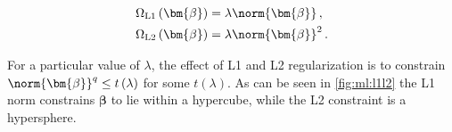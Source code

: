 \begin{subequations} \label{eq:L1_L2}
\begin{align}
\Omega_{\text{L1}}\left(\bm{\beta}\right) &= \lambda \norm{\bm{\beta}}\,,     \label{eq:L1} \\
\Omega_{\text{L2}}\left(\bm{\beta}\right) &= \lambda \norm{\bm{\beta}}^{2}\,. \label{eq:L2}
\end{align}
\end{subequations}

For a particular value of $\lambda$, the effect of L1 and L2 regularization
is to constrain $\norm{\bm{\beta}}^{q} \leq t\left(\lambda\right)$ for some $t\left(\lambda\right)$.
As can be seen in \cref{fig:ml:l1l2} the L1 norm constrains $\bm{\beta}$ to lie within a hypercube,
while the L2 constraint is a hypersphere.


